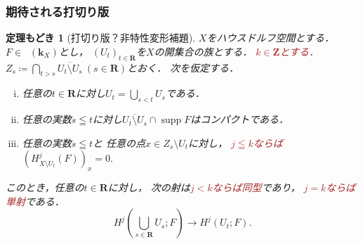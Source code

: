 \documentclass[dvipdfmx,10pt,aspectratio=169,leqno]{beamer}%
\newcommand{\zz}{\mathbf{Z}}
\newcommand{\rr}{\mathbf{R}}
\newcommand{\kk}{\mathbf{k}}
\numberwithin{equation}{subsection}
\newcommand{\supp}{\mathop{\mathrm{supp}}\nolimits}
\newcommand{\Dompl}{\mathop{\mathsf{D}^\mathrm{+}}\nolimits}
\theoremstyle{mystyle}
\newtheorem{HM}[AXM]{定理もどき}
\begin{document}
\begin{frame}
    \frametitle{期待される打切り版}
  \begin{HM}[打切り版？非特性変形補題]
    \(X\)をハウスドルフ空間とする．
    \(F\in\Dompl(\kk_X)\)とし，
    \(\left(U_{t}\right)_{t\in\rr}\)を\(X\)の開集合の族とする．
    \textcolor{brown}{\(k\in\zz\)とする．}
    \(
      Z_{s}\coloneqq \bigcap_{t>s}\overline{U_t\setminus U_s}\ (s\in\rr)
    \)とおく．
    次を仮定する．%
    \begin{enumerate}[(i)]
      \setlength{\leftskip}{10pt}
      \item \label{item:t-nonchar1}
      任意の\(t\in\rr\)に対し\(U_{t}=\bigcup_{s<t}U_{s}\)である．
      \item \label{item:t-nonchar2}
      任意の実数\(s\leqq t\)に対し\(
        \overline{U_{t}\setminus U_{s}}\cap \supp{F}
      \)はコンパクトである．
      \item \label{item:t-nonchar3}
      任意の実数\(s\leqq t\)と
      任意の点\(x\in Z_{s}\setminus U_{t}\)に対し，
      \textcolor{brown}{\(j\leqq k\)ならば}
      \(
        (H^{j}_{X\setminus U_{t}}(F))_{x}=0. 
      \)
    \end{enumerate}
    このとき，任意の\(t\in\rr\)に対し，
    次の射は\textcolor{brown}{\(j<k\)ならば同型}であり，
    \textcolor{brown}{\(j=k\)ならば単射}である．
    \[
      H^{j}\left(\bigcup_{s\in\rr}U_{s};F\right)
      \to
      H^{j}\left(U_{t};F\right).
    \]
  \end{HM}
\end{frame}
\end{document}
